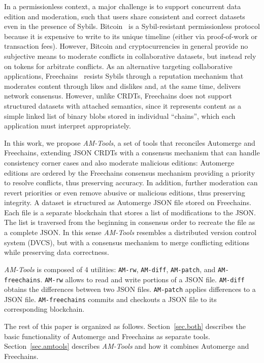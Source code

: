 \documentclass[12pt]{article}
\begin{document}
In a permissionless context, a major challenge is to support concurrent data
edition and moderation, such that users share consistent and correct datasets
even in the presence of Sybils.
%
Bitcoin~\cite{nakamoto2008bitcoin} is a Sybil-resistant permissionless protocol
because it is expensive to write to its unique timeline (either via
proof-of-work or transaction fees).
However, Bitcoin and cryptocurrencies in general provide no subjective means to
moderate conflicts in collaborative datasets, but instead rely on tokens for
arbitrate conflicts.
%
As an alternative targeting collaborative applications,
Freechains~\cite{sant2020freechains} resists Sybils through a reputation
mechanism that moderates content through likes and dislikes and, at the same
time, delivers network consensus.
However, unlike CRDTs, Freechains does not support structured datasets with
attached semantics, since it represents content as a simple linked list of
binary blobs stored in individual ``chains'', which each application must
interpret appropriately.

In this work, we propose \emph{AM-Tools}, a set of tools that reconciles
Automerge and Freechains, extending JSON CRDTs with a consensus mechanism that
can handle consistency corner cases and also moderate malicious editions:
Automerge editions are ordered by the Freechains consensus mechanism providing
a priority to resolve conflicts, thus preserving accuracy.
In addition, further moderation can revert priorities or even remove abusive or
malicious editions, thus preserving integrity.
%
A dataset is structured as Automerge JSON file stored on Freechains.
Each file is a separate blockchain that stores a list of modifications to the
JSON.
The list is traversed from the beginning in consensus order to recreate the
file as a complete JSON.
%
In this sense \emph{AM-Tools} resembles a distributed version control system
(DVCS), but with a consensus mechanism to merge conflicting editions while
preserving data correctness.

\emph{AM-Tools} is composed of 4 utilities: \texttt{AM-rw}, \texttt{AM-diff},
\texttt{AM-patch}, and \texttt{AM-freechains}.
%
\texttt{AM-rw} allows to read and write portions of a JSON file.
\texttt{AM-diff} obtains the differences between two JSON files.
\texttt{AM-patch} applies differences to a JSON file.
\texttt{AM-freechains} commits and checkouts a JSON file to its corresponding
blockchain.

The rest of this paper is organized as follows.
Section~\ref{sec.both} describes the basic functionality of Automerge and
Freechains as separate tools.
Section~\ref{sec.amtools} describes \emph{AM-Tools} and how it combines
Automerge and Freechains.
\end{document}
